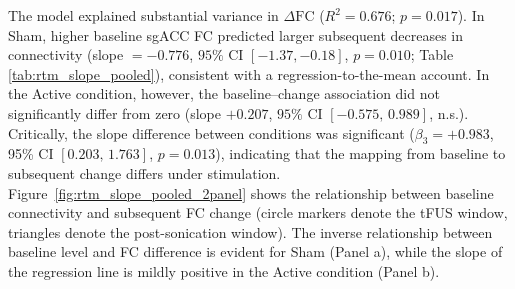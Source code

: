         The model explained substantial variance in $\Delta \mathrm{FC}$ ($R^2=0.676$; $p=0.017$). In Sham, higher baseline sgACC FC predicted larger subsequent decreases in connectivity (slope $=-0.776$, $95\%$ CI $[-1.37,-0.18]$, $p=0.010$; Table \ref{tab:rtm_slope_pooled}), consistent with a regression-to-the-mean account. In the Active condition, however, the baseline--change association did not significantly differ from zero (slope $+0.207$, $95\%$ CI $[-0.575,\,0.989]$, n.s.). Critically, the slope difference between conditions was significant ($\beta_3=+0.983$, 95\% CI $[0.203,\,1.763]$, $p=0.013$), indicating that the mapping from baseline to subsequent change differs under stimulation. Figure~\ref{fig:rtm_slope_pooled_2panel} shows the relationship between baseline connectivity and subsequent FC change (circle markers denote the tFUS window, triangles denote the post-sonication window). The inverse relationship between baseline level and FC difference is evident for Sham (Panel a), while the slope of the regression line is mildly positive in the Active condition (Panel b).


